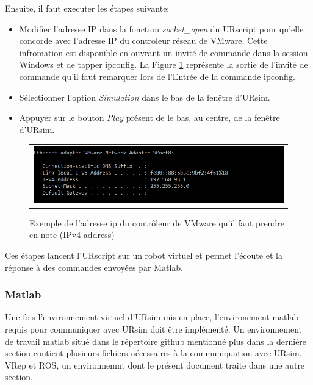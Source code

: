 Ensuite, il faut executer les étapes suivante:
\begin{itemize}
\item Modifier l'adresse IP dans la fonction \textit{socket\_open} du URscript pour qu'elle concorde avec l'adresse IP du controleur réseau de VMware. Cette infromation est disponible en ouvrant un invité de commande dans la session Windows et de tapper ipconfig. La Figure \ref{fig:windows_ip} représente la sortie de l'invité de commande qu'il faut remarquer lors de l'Entrée de la commande ipconfig.
\item Sélectionner l'option \textit{Simulation} dans le bas de la fenêtre d'URsim.
\item Appuyer sur le bouton \textit{Play} présent de le bas, au centre, de la fenêtre d'URsim.
\end{itemize}
\begin{figure}
 \begin{center}
  \begin{tabular}{c}
    \includegraphics[trim=0cm 0cm 0cm 0cm, scale=0.5]{screenshots_tuto_ursim/windows_ip.png}
  \end{tabular}
 \end{center}
\caption{Exemple de l'adresse ip du contrôleur de VMware qu'il faut prendre en note (IPv4 address)}
 \label{fig:windows_ip}
\end{figure}
Ces étapes lancent l'URscript sur un robot virtuel et permet l'écoute et la réponse à des commandes envoyées par Matlab.


\subsubsection{Matlab}

Une fois l'environnement virtuel d'URsim mis en place, l'environement matlab requis pour communiquer avec URsim doit être implémenté.
Un environnement de travail matlab situé dans le répertoire github mentionné plus dans la dernière section contient plusieurs fichiers nécessaires à la communiquation avec URsim, VRep et ROS, un environnemnt dont le présent document traite dans une autre section.




